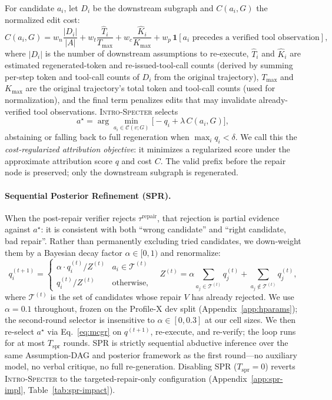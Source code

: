 \documentclass{article}
\newcommand{\method}{\textsc{Intro-Specter}\xspace}
\begin{document}
For candidate $a_i$, let $D_i$ be the downstream subgraph and $C(a_i, G)$ the normalized edit cost:
\begin{equation}
  C(a_i, G) = w_n \frac{|D_i|}{|A|} + w_t \frac{\hat{T}_i}{T_{\max}} + w_c \frac{\hat{K}_i}{K_{\max}} + w_p \,\mathbf{1}[a_i \text{ precedes a verified tool observation}],\label{eq:edit-cost}
\end{equation}
where $|D_i|$ is the number of downstream assumptions to re-execute, $\hat{T}_i$ and $\hat{K}_i$ are estimated regenerated-token and re-issued-tool-call counts (derived by summing per-step token and tool-call counts of $D_i$ from the original trajectory), $T_{\max}$ and $K_{\max}$ are the original trajectory's total token and tool-call counts (used for normalization), and the final term penalizes edits that may invalidate already-verified tool observations. \method selects
\begin{equation}
  a^\star = \arg\min_{a_i \in \mathcal{C}(v;G)} \bigl[-q_i + \lambda\, C(a_i, G)\bigr],\label{eq:mcgr}
\end{equation}
abstaining or falling back to full regeneration when $\max_i q_i < \delta$. We call this the \emph{cost-regularized attribution objective}: it minimizes a regularized score under the approximate attribution score $q$ and cost $C$. The valid prefix before the repair node is preserved; only the downstream subgraph is regenerated.

\paragraph{Sequential Posterior Refinement (SPR).} When the post-repair verifier rejects $\tau^{\text{repair}}$, that rejection is partial evidence against $a^\star$: it is consistent with both ``wrong candidate'' and ``right candidate, bad repair''. Rather than permanently excluding tried candidates, we down-weight them by a Bayesian decay factor $\alpha \in [0,1)$ and renormalize:
\begin{equation}
  q^{(t+1)}_i = \begin{cases} \alpha \cdot q^{(t)}_i \big/ Z^{(t)} & a_i \in \mathcal{T}^{(t)} \\ q^{(t)}_i \big/ Z^{(t)} & \text{otherwise,} \end{cases} \quad Z^{(t)} = \alpha \!\!\sum_{a_j \in \mathcal{T}^{(t)}}\! q^{(t)}_j + \!\!\sum_{a_j \notin \mathcal{T}^{(t)}}\! q^{(t)}_j,\label{eq:spr-update}
\end{equation}
where $\mathcal{T}^{(t)}$ is the set of candidates whose repair $V$ has already rejected. We use $\alpha = 0.1$ throughout, frozen on the Profile-X dev split (Appendix~\ref{app:hparams}); the second-round selector is insensitive to $\alpha \in [0, 0.3]$ at our cell sizes. We then re-select $a^\star$ via Eq.~\ref{eq:mcgr} on $q^{(t+1)}$, re-execute, and re-verify; the loop runs for at most $T_{\text{spr}}$ rounds. SPR is strictly sequential abductive inference over the same Assumption-DAG and posterior framework as the first round---no auxiliary model, no verbal critique, no full re-generation. Disabling SPR ($T_{\text{spr}}=0$) reverts \method to the targeted-repair-only configuration (Appendix~\ref{app:spr-impl}, Table~\ref{tab:spr-impact}).
\end{document}
